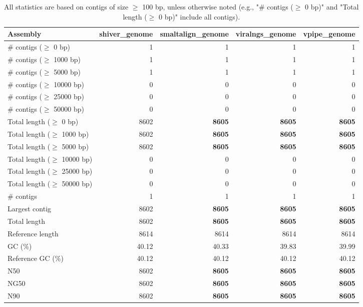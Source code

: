 \documentclass[12pt,a4paper]{article}
\begin{document}
\begin{table}[ht]
\begin{center}
\caption{All statistics are based on contigs of size $\geq$ 100 bp, unless otherwise noted (e.g., "\# contigs ($\geq$ 0 bp)" and "Total length ($\geq$ 0 bp)" include all contigs).}
\begin{tabular}{|l*{4}{|r}|}
\hline
Assembly & shiver\_genome & smaltalign\_genome & viralngs\_genome & vpipe\_genome \\ \hline
\# contigs ($\geq$ 0 bp) & 1 & 1 & 1 & 1 \\ \hline
\# contigs ($\geq$ 1000 bp) & 1 & 1 & 1 & 1 \\ \hline
\# contigs ($\geq$ 5000 bp) & 1 & 1 & 1 & 1 \\ \hline
\# contigs ($\geq$ 10000 bp) & 0 & 0 & 0 & 0 \\ \hline
\# contigs ($\geq$ 25000 bp) & 0 & 0 & 0 & 0 \\ \hline
\# contigs ($\geq$ 50000 bp) & 0 & 0 & 0 & 0 \\ \hline
Total length ($\geq$ 0 bp) & 8602 & {\bf 8605} & {\bf 8605} & {\bf 8605} \\ \hline
Total length ($\geq$ 1000 bp) & 8602 & {\bf 8605} & {\bf 8605} & {\bf 8605} \\ \hline
Total length ($\geq$ 5000 bp) & 8602 & {\bf 8605} & {\bf 8605} & {\bf 8605} \\ \hline
Total length ($\geq$ 10000 bp) & 0 & 0 & 0 & 0 \\ \hline
Total length ($\geq$ 25000 bp) & 0 & 0 & 0 & 0 \\ \hline
Total length ($\geq$ 50000 bp) & 0 & 0 & 0 & 0 \\ \hline
\# contigs & 1 & 1 & 1 & 1 \\ \hline
Largest contig & 8602 & {\bf 8605} & {\bf 8605} & {\bf 8605} \\ \hline
Total length & 8602 & {\bf 8605} & {\bf 8605} & {\bf 8605} \\ \hline
Reference length & 8614 & 8614 & 8614 & 8614 \\ \hline
GC (\%) & 40.12 & 40.33 & 39.83 & 39.99 \\ \hline
Reference GC (\%) & 40.12 & 40.12 & 40.12 & 40.12 \\ \hline
N50 & 8602 & {\bf 8605} & {\bf 8605} & {\bf 8605} \\ \hline
NG50 & 8602 & {\bf 8605} & {\bf 8605} & {\bf 8605} \\ \hline
N90 & 8602 & {\bf 8605} & {\bf 8605} & {\bf 8605} \\ \hline

\end{tabular}
\end{center}
\end{table}
\end{document}
